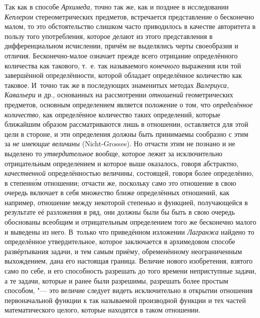 Так как в способе {\em Архимеда,} точно так же, как и позднее в исследовании
{\em Кеплером} стереометрических предметов, встречается представление о
бесконечно малом, то это обстоятельство слишком часто приводилось в качестве
авторитета в пользу того употребления, которое делают из этого представления в
дифференциальном исчислении, причём не выделялись черты своеобразия и отличия.
Бесконечно-малое означает прежде всего отрицание определённого количества как
такового, т.~е. так называемого {\em конечного} выражения или той завершённой
определённости, которой обладает определённое количество как таковое. И~точно
так же в последующих знаменитых методах {\em Валериуса, Кавальери} и др.,
основанных на рассмотрении {\em отношений} геометрических предметов, основным
определением является положение о том, что {\em определённое количество,} как
определённое количество таких определений, которые ближайшим образом
рассматриваются лишь в отношении, оставляется для этой цели в стороне, и эти
определения должны быть принимаемы сообразно с этим за {\em не имеющие
величины} (Nicht-Grosses). Но отчасти этим не познано и не выделено то
{\em утвердительное} вообще, которое лежит за исключительно отрицательным
определением и которое выше оказалось, говоря абстрактно, {\em качественной}
определённостью величины, состоящей, говоря более определённо, в степенн\'{о}м
отношении; отчасти же, поскольку само это отношение в свою очередь включает в
себя множество ближе определённых отношений, как например, отношение между
некоторой степенью и функцией, получающейся в результате её разложения в ряд,
они должны были бы быть в свою очередь обоснованы всеобщим и отрицательным
определением того же бесконечно малого и выведены из него. В~только что
приведённом изложении {\em Лагранжа} найдено то определённое утвердительное,
которое заключается в архимедовом способе развёртывания задачи, и тем самым
приёму, обременённому неограниченным выхождением, дана его настоящая граница.
Величие нового изобретения, взятого само по себе, и его способность разрешать
до того времени неприступные задачи, а те задачи, которые и ранее были
разрешимы, разрешать более простым способом, "--- это величие следует видеть
исключительно в открытии отношения первоначальной функции к так называемой
производной функции и тех частей математического целого, которые находятся в
таком отношении.

